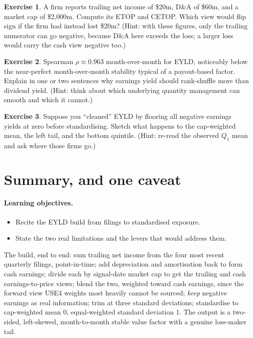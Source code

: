 \documentclass[11pt]{article}
\theoremstyle{definition}
\newtheorem{exercise}{Exercise}[section]
\theoremstyle{plain}
\theoremstyle{remark}
\begin{document}
\begin{exercise}
A firm reports trailing net income of \$20m, D\&A of \$60m, and a market cap of \$2,000m. Compute its ETOP and CETOP. Which view would flip sign if the firm had instead lost \$20m? (Hint: with these figures, only the trailing numerator can go negative, because D\&A here exceeds the loss; a larger loss would carry the cash view negative too.)
\end{exercise}

\begin{exercise}
Spearman $\rho \approx 0.963$ month-over-month for EYLD, noticeably below the near-perfect month-over-month stability typical of a payout-based factor. Explain in one or two sentences why earnings yield should rank-shuffle more than dividend yield. (Hint: think about which underlying quantity management can smooth and which it cannot.)
\end{exercise}

\begin{exercise}
Suppose you ``cleaned'' EYLD by flooring all negative earnings yields at zero before standardising. Sketch what happens to the cap-weighted mean, the left tail, and the bottom quintile. (Hint: re-read the observed $Q_1$ mean and ask where those firms go.)
\end{exercise}

\section{Summary, and one caveat}\label{sec:summary}

\paragraph{Learning objectives.}
\begin{itemize}[leftmargin=1.4em,topsep=2pt]
  \item Recite the EYLD build from filings to standardised exposure.
  \item State the two real limitations and the levers that would address them.
\end{itemize}

The build, end to end: sum trailing net income from the four most recent quarterly filings, point-in-time; add depreciation and amortisation back to form cash earnings; divide each by signal-date market cap to get the trailing and cash earnings-to-price views; blend the two, weighted toward cash earnings, since the forward view USE4 weights most heavily cannot be sourced; \emph{keep} negative earnings as real information; trim at three standard deviations; standardise to cap-weighted mean $0$, equal-weighted standard deviation $1$. The output is a two-sided, left-skewed, month-to-month stable value factor with a genuine loss-maker tail.
\end{document}
